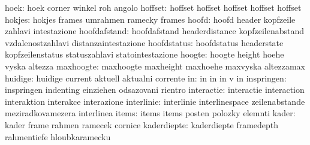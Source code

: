                      hoek: hoek                      corner
                           winkel                    roh
                           angolo
                  hoffset: hoffset                   hoffset
                           hoffset                   hoffset
                           hoffset                   %
                   hokjes: hokjes                    frames
                           umrahmen                  ramecky
                           frames                    %
                    hoofd: hoofd                     header
                           kopfzeile                 zahlavi
                           intestazione %
             hoofdafstand: hoofdafstand              headerdistance
                           kopfzeilenabstand         vzdalenostzahlavi
                           distanzaintestazione
              hoofdstatus: hoofdstatus               headerstate
                           kopfzeilenstatus          statuszahlavi
                           statointestazione
                   hoogte: hoogte                    height
                           hoehe                     vyska
                           altezza
                maxhoogte: maxhoogte                 maxheight
                           maxhoehe                  maxvyska
                           altezzamax
                  huidige: huidige                   current
                           aktuell                   aktualni
                           corrente
                       in: in                        in
                           in                        v
                           in
               inspringen: inspringen                indenting
                           einziehen                 odsazovani
                           rientro
               interactie: interactie                interaction
                           interaktion               interakce
                           interazione
               interlinie: interlinie                interlinespace
                           zeilenabstande            meziradkovamezera
                           interlinea
                    items: items                     items
                           posten                    polozky
                           elemnti
                    kader: kader                     frame
                           rahmen                    ramecek
                           cornice
              kaderdiepte: kaderdiepte               framedepth
                           rahmentiefe               hloubkaramecku

